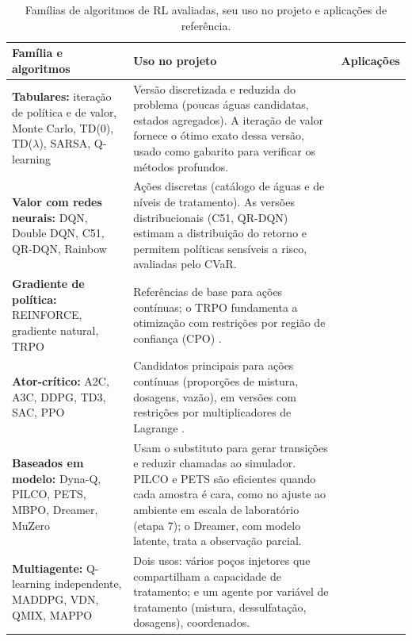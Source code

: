 \documentclass[11pt,a4paper]{article}
\begin{document}
\begin{table}[!htbp]
\centering
\footnotesize
{}
\caption{Famílias de algoritmos de RL avaliadas, seu uso no projeto e aplicações de referência.}
\label{tab:rl}
\begin{tabularx}{\textwidth}{@{}>{\raggedright\arraybackslash}p{}>{\raggedright\arraybackslash}X>{\raggedright\arraybackslash}p{}@{}}
\toprule
\textbf{Família e algoritmos} & \textbf{Uso no projeto} & \textbf{Aplicações} \\
\midrule
\textbf{Tabulares:} iteração de política e de valor, Monte Carlo, TD(0), TD($\lambda$), SARSA, Q-learning
 & Versão discretizada e reduzida do problema (poucas águas candidatas, estados agregados). A iteração de valor fornece o ótimo exato dessa versão, usado como gabarito para verificar os métodos profundos.
 & \cite{lutter2021rvi,mcuav2022,rizvi2021tnnls,rizvi2023jas} \\
\addlinespace
\textbf{Valor com redes neurais:} DQN, Double DQN, C51, QR-DQN, Rainbow
 & Ações discretas (catálogo de águas e de níveis de tratamento). As versões distribucionais (C51, QR-DQN) estimam a distribuição do retorno e permitem políticas sensíveis a risco, avaliadas pelo CVaR.
 & \cite{fang2022hvac,alsayed2026,iccc2024nav} \\
\addlinespace
\textbf{Gradiente de política:} REINFORCE, gradiente natural, TRPO
 & Referências de base para ações contínuas; o TRPO fundamenta a otimização com restrições por região de confiança (CPO) \cite{achiam2017}.
 & \cite{nakamura2005,centurelli2022} \\
\addlinespace
\textbf{Ator-crítico:} A2C, A3C, DDPG, TD3, SAC, PPO
 & Candidatos principais para ações contínuas (proporções de mistura, dosagens, vazão), em versões com restrições por multiplicadores de Lagrange \cite{ray2019}.
 & \cite{jobe2025hvac,zhong2022designs,du2021hvac,fan2024uuv,benhazem2026,silvestri2024,wang2025dce,elagroudi2025} \\
\addlinespace
\textbf{Baseados em modelo:} Dyna-Q, PILCO, PETS, MBPO, Dreamer, MuZero
 & Usam o substituto para gerar transições e reduzir chamadas ao simulador. PILCO e PETS são eficientes quando cada amostra é cara, como no ajuste ao ambiente em escala de laboratório (etapa 7); o Dreamer, com modelo latente, trata a observação parcial.
 & \cite{hu2019sym,ifac2025pilco,ye2025mbrl,wu2023daydreamer} \\
\addlinespace
\textbf{Multiagente:} Q-learning independente, MADDPG, VDN, QMIX, MAPPO
 & Dois usos: vários poços injetores que compartilham a capacidade de tratamento; e um agente por variável de tratamento (mistura, dessulfatação, dosagens), coordenados.

\end{tabularx}
\end{table}
\end{document}
